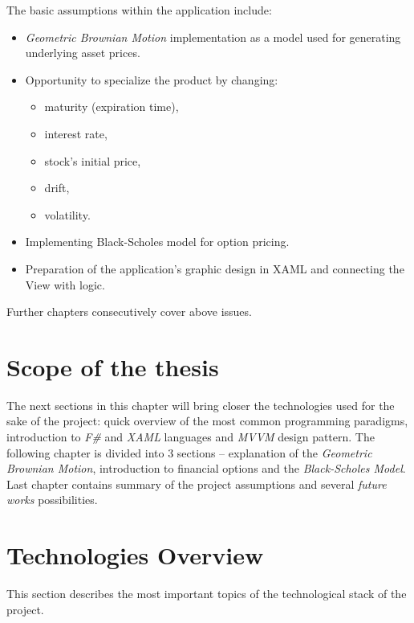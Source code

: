     The basic assumptions within the application include:
    \begin{itemize}
        \item \textit{Geometric Brownian Motion} implementation as a model used for generating underlying asset prices.
        \item Opportunity to specialize the product by changing:
            \begin{itemize}
                \item maturity (expiration time),
                \item interest rate,
                \item stock's initial price,
                \item drift,
                \item volatility.
            \end{itemize}
        \item Implementing Black-Scholes model for option pricing.
        \item Preparation of the application's graphic design in XAML and connecting the View with logic.
    \end{itemize}
    
    \noindent
    Further chapters consecutively cover above issues.
    
\section{Scope of the thesis}
    The next sections in this chapter will bring closer the technologies used for the sake of the project: quick overview of the most common programming paradigms, introduction to \textit{F\#} and \textit{XAML} languages and \textit{MVVM} design pattern.
    The following chapter is divided into 3 sections -- explanation of the \textit{Geometric Brownian Motion}, introduction to financial options and the \textit{Black-Scholes Model}.
    Last chapter contains summary of the project assumptions and several \textit{future works} possibilities.
    
\section{Technologies Overview}
    This section describes the most important topics of the technological stack of the project.
